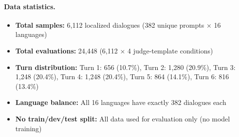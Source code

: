\paragraph{Data statistics.}
\begin{itemize}[leftmargin=1.2em, itemsep=1pt]
  \item \textbf{Total samples:} 6,112 localized dialogues (382 unique prompts × 16 languages)
  \item \textbf{Total evaluations:} 24,448 (6,112 × 4 judge-template conditions)
  \item \textbf{Turn distribution:} Turn 1: 656 (10.7\%), Turn 2: 1,280 (20.9\%), Turn 3: 1,248 (20.4\%), Turn 4: 1,248 (20.4\%), Turn 5: 864 (14.1\%), Turn 6: 816 (13.4\%)
  \item \textbf{Language balance:} All 16 languages have exactly 382 dialogues each
  \item \textbf{No train/dev/test split:} All data used for evaluation only (no model training)
\end{itemize}


